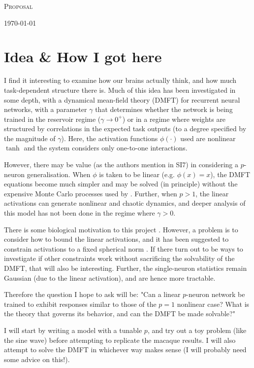 \documentclass[letterpaper]{article}
\begin{document}
    \begin{centering}

        {\huge \textsc{Proposal}} \
        \author{Akshat Chaudhary}
        \vspace{0.25cm}
        
        \today
        
    \end{centering}	

    \section{Idea \& How I got here}
    I find it interesting to examine how our brains actually think, and how much task-dependent structure there is. Much of this idea has been investigated \cite{clark2026} in some depth, with a dynamical mean-field theory (DMFT) for recurrent neural networks, with a parameter $ \gamma $ that determines whether the network is being trained in the reservoir regime ($ \gamma \rightarrow 0^+ $) or in a regime where weights are structured by correlations in the expected task outputs (to a degree specified by the magnitude of $ \gamma $). Here, the activation functions $ \phi\left( \cdot \right)  $ used are nonlinear $ \tanh $ and the system considers only one-to-one interactions.

    However, there may be value (as the authors mention in SI7) in considering a $ p $-neuron generalisation. When $ \phi $ is taken to be linear (e.g. $ \phi(x) = x $), the DMFT equations become much simpler and may be solved (in principle) without the expensive Monte Carlo processes used by \cite{clark2026}. Further, when $ p > 1 $, the linear activations can generate nonlinear and chaotic dynamics, and deeper analysis of this model has not been done in the regime where $ \gamma > 0 $.

    There is some biological motivation to this project \cite{kozachkov2025}. However, a problem is to consider how to bound the linear activations, and it has been suggested to constrain activations to a fixed spherical norm \cite{clark2026}. If there turn out to be ways to investigate if other constraints work without sacrificing the solvability of the DMFT, that will also be interesting. Further, the single-neuron statistics remain Gaussian (due to the linear activation), and are hence more tractable.

    Therefore the question I hope to ask will be: "Can a linear $ p $-neuron network be trained to exhibit responses similar to those of the $ p=1 $ nonlinear case? What is the theory that governs its behavior, and can the DMFT be made solvable?"

    I will start by writing a model with a tunable $ p $, and try out a toy problem (like the sine wave) before attempting to replicate the macaque results. I will also attempt to solve the DMFT in whichever way makes sense (I will probably need some advice on this!).



\end{document}
